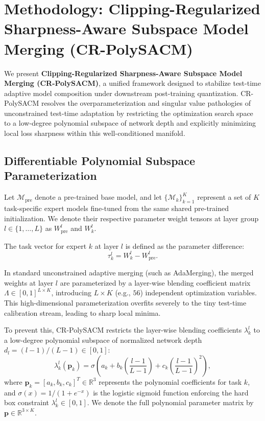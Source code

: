 \section{Methodology: Clipping-Regularized Sharpness-Aware Subspace Model Merging (CR-PolySACM)}
\label{sec:methodology}

We present \textbf{Clipping-Regularized Sharpness-Aware Subspace Model Merging (CR-PolySACM)}, a unified framework designed to stabilize test-time adaptive model composition under downstream post-training quantization. CR-PolySACM resolves the overparameterization and singular value pathologies of unconstrained test-time adaptation by restricting the optimization search space to a low-degree polynomial subspace of network depth and explicitly minimizing local loss sharpness within this well-conditioned manifold.

\subsection{Differentiable Polynomial Subspace Parameterization}
Let $\mathcal{M}_{\text{pre}}$ denote a pre-trained base model, and let $\{\mathcal{M}_k\}_{k=1}^K$ represent a set of $K$ task-specific expert models fine-tuned from the same shared pre-trained initialization. We denote their respective parameter weight tensors at layer group $l \in \{1, \dots, L\}$ as $W_{\text{pre}}^l$ and $W_k^l$. 

The task vector for expert $k$ at layer $l$ is defined as the parameter difference:
\begin{equation}
    \tau_k^l = W_k^l - W_{\text{pre}}^l.
\end{equation}

In standard unconstrained adaptive merging (such as AdaMerging), the merged weights at layer $l$ are parameterized by a layer-wise blending coefficient matrix $\Lambda \in [0, 1]^{L \times K}$, introducing $L \times K$ (e.g., $56$) independent optimization variables. This high-dimensional parameterization overfits severely to the tiny test-time calibration stream, leading to sharp local minima.

To prevent this, CR-PolySACM restricts the layer-wise blending coefficients $\lambda_k^l$ to a low-degree polynomial subspace of normalized network depth $d_l = (l-1)/(L-1) \in [0, 1]$:
\begin{equation}
\label{eq:poly_mapping}
    \lambda_k^l(\mathbf{p}_k) = \sigma\left(a_k + b_k \left(\frac{l-1}{L-1}\right) + c_k \left(\frac{l-1}{L-1}\right)^2\right),
\end{equation}
where $\mathbf{p}_k = [a_k, b_k, c_k]^T \in \mathbb{R}^3$ represents the polynomial coefficients for task $k$, and $\sigma(x) = 1/(1 + e^{-x})$ is the logistic sigmoid function enforcing the hard box constraint $\lambda_k^l \in [0, 1]$. We denote the full polynomial parameter matrix by $\mathbf{p} \in \mathbb{R}^{3 \times K}$.

